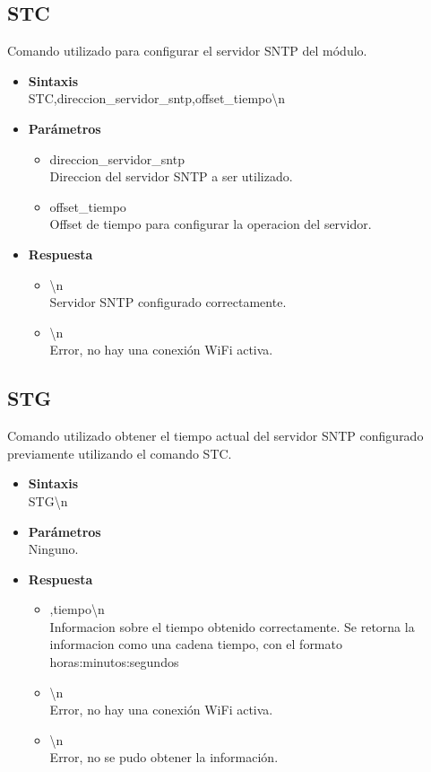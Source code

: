\documentclass[a4paper,spanish]{article}
\begin{document}
\subsection{STC}
Comando utilizado para configurar el servidor SNTP del módulo. 
\begin{itemize}
	\item \textbf{Sintaxis}\\
	{\ttfamily STC,direccion\_servidor\_sntp,offset\_tiempo\textbackslash n}
	\item \textbf{Parámetros}
	\begin{itemize}
		\item{\ttfamily direccion\_servidor\_sntp}\\
		Direccion del servidor SNTP a ser utilizado.
		\item{\ttfamily offset\_tiempo}\\
		Offset de tiempo para configurar la operacion del servidor.
	\end{itemize}
	\item \textbf{Respuesta}
	\begin{itemize}
		\item{\textbackslash n} \\
		Servidor SNTP configurado correctamente.
		\item{\textbackslash n} \\
		Error, no hay una conexión WiFi activa.
	\end{itemize}
\end{itemize}

\subsection{STG}
Comando utilizado obtener el tiempo actual del servidor SNTP configurado previamente utilizando el comando STC. 
\begin{itemize}
	\item \textbf{Sintaxis}\\
	{\ttfamily STG\textbackslash n}
	\item \textbf{Parámetros}\\
	Ninguno.
	\item \textbf{Respuesta}
	\begin{itemize}
		\item{,tiempo\textbackslash n} \\
		Informacion sobre el tiempo obtenido correctamente. Se retorna la informacion como una cadena {\ttfamily tiempo}, con el formato {\ttfamily horas:minutos:segundos}
		\item{\textbackslash n} \\
		Error, no hay una conexión WiFi activa.
		\item{\textbackslash n} \\
		Error, no se pudo obtener la información.
	\end{itemize}
\end{itemize}
\end{document}
